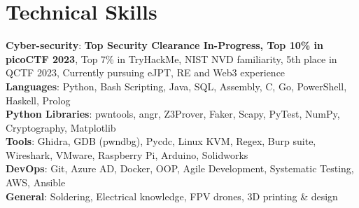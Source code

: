\section{Technical Skills}

\begin{itemize}[leftmargin=0.15in, label={}]
    \small{\item{
        \textbf{Cyber-security}{: \textbf{Top Security Clearance In-Progress, Top 10\% in picoCTF 2023}, Top 7\% in TryHackMe, NIST NVD familiarity, 5th place in QCTF 2023, Currently pursuing eJPT, RE and Web3 experience} \\ \vspace{1.5mm}
        \textbf{Languages}{: Python, Bash Scripting, Java, SQL, Assembly, C, Go, PowerShell, Haskell, Prolog} \\ \vspace{1.5mm}
        \textbf{Python Libraries}{: pwntools, angr, Z3Prover, Faker, Scapy, PyTest, NumPy, Cryptography, Matplotlib} \\ \vspace{1.5mm}
        \textbf{Tools}{: Ghidra, GDB (pwndbg), Pycdc, Linux KVM, Regex, Burp suite, Wireshark, VMware, Raspberry Pi, Arduino, Solidworks} \\ \vspace{1.5mm}
        \textbf{DevOps}{: Git, Azure AD, Docker, OOP, Agile Development, Systematic Testing, AWS, Ansible}\\ \vspace{1.5mm}
        \textbf{General}{: Soldering, Electrical knowledge, FPV drones, 3D printing \& design}\\
    }}
\end{itemize}